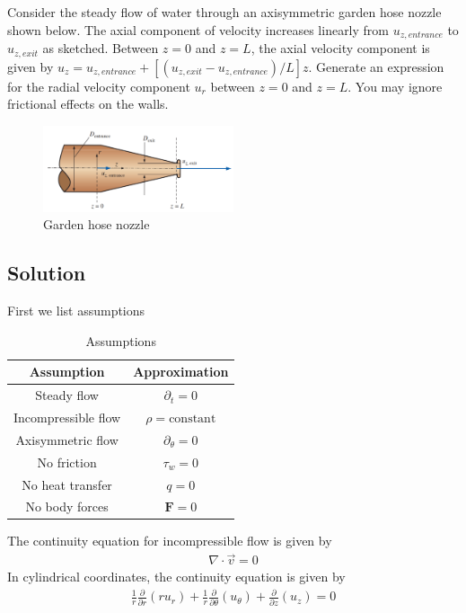 \section{}

Consider the steady flow of water through an axisymmetric garden hose nozzle shown below. The axial component of velocity increases linearly from $u_{z,entrance}$ to $u_{z,exit}$ as sketched. Between $z = 0$ and $z = L$, the axial velocity component is given by $u_z = u_{z,entrance} + [(u_{z,exit} - u_{z,entrance})/L]z$. Generate an expression for the radial velocity component $u_r$ between $z = 0$ and $z = L$. You may ignore frictional effects on the walls.
\begin{figure}[h]
    \centering
    \includegraphics[width=0.5\textwidth]{Questions/Figures/q3 problem diagram.png}
    \caption{Garden hose nozzle}
\end{figure}

\subsection*{Solution}
First we list assumptions
\begin{table}
    \centering
    \caption{Assumptions}
    \begin{tabular}{c|c}
        Assumption & Approximation \\
        \hline
        Steady flow & $\partial_t = 0$ \\
        Incompressible flow & $\rho = \text{constant}$ \\
        Axisymmetric flow & $\partial_{\theta} = 0$ \\
        No friction & $\tau_{w} = 0$ \\
        No heat transfer & $q = 0$ \\
        No body forces & $\mathbf{F} = 0$ \\
    \end{tabular}
\end{table}
The continuity equation for incompressible flow is given by
\begin{align*}
    \nabla \cdot \vec{v} = 0
\end{align*}
In cylindrical coordinates, the continuity equation is given by
\begin{align*}
    \frac{1}{r}\frac{\partial}{\partial r}(r u_r) + \frac{1}{r}\frac{\partial}{\partial \theta}(u_{\theta}) + \frac{\partial}{\partial z}(u_z) = 0
\end{align*}